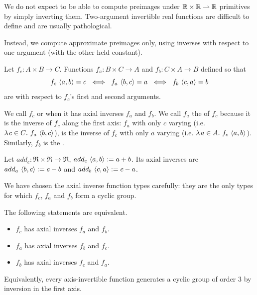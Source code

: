 We do not expect to be able to compute preimages under $\mathbb{R} \times \mathbb{R} \rightharpoonup \mathbb{R}$ primitives by simply inverting them.
Two-argument invertible real functions are difficult to define and are usually pathological.

Instead, we compute approximate preimages only, using inverses with respect to one argument (with the other held constant).

\begin{definition}
\label{def:axial-inverse}
Let $f_c : A \times B \to C$.
Functions $f_a : B \times C \to A$ and $f_b : C \times A \to B$ defined so that
\begin{equation}
	f_c~\pair{a,b} = c\ \iff\ f_a~\pair{b,c} = a\ \iff\ f_b~\pair{c,a} = b
\end{equation}
are  with respect to $f_c$'s first and second arguments.
\end{definition}

We call $f_c$  or  when it has axial inverses $f_a$ and $f_b$.
We call $f_a$ the  of $f_c$ because it is the inverse of $f_c$ along the first axis: $f_a$ with only $c$ varying (i.e. $\lambda\mspace{2mu}{c \in C}\ldotp\, f_a~\langle{b,c}\rangle$), is the inverse of $f_c$ with only $a$ varying (i.e. $\lambda\mspace{2mu}{a \in A}\ldotp\, f_c~\langle{a,b}\rangle$).
Similarly, $f_b$ is the .

\begin{example}
\label{ex:plus-axial-inverses}
Let $add_c : \Re \times \Re \to \Re$, $add_c~\langle{a,b}\rangle := a+b$.
Its axial inverses are $add_a~\langle{b,c}\rangle := c - b$ and $add_b~\langle{c,a}\rangle := c - a$.
\exampleqed
\end{example}

We have chosen the axial inverse function types carefully: they are the only types for which $f_c$, $f_a$ and $f_b$ form a cyclic group.

\begin{lemma}
\label{lem:axial-inverse-cyclic-group}
The following statements are equivalent.
\begin{itemize}
	\item $f_c$ has axial inverses $f_a$ and $f_b$.
	\item $f_a$ has axial inverses $f_b$ and $f_c$.
	\item $f_b$ has axial inverses $f_c$ and $f_a$.
\end{itemize}
Equivalently, every axis-invertible function generates a cyclic group of order 3 by inversion in the first axis.
\end{lemma}


